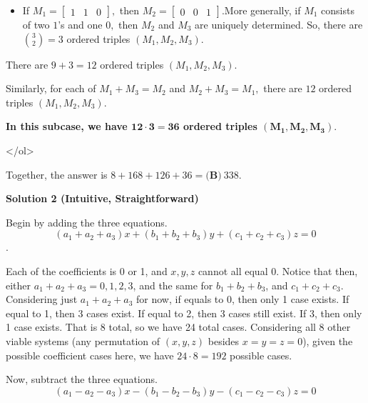 \begin{enumerate}
\begin{enumerate}
\begin{itemize}
        \item If $M_1=\begin{bmatrix}1 & 1 & 0\end{bmatrix},$ then $M_2=\begin{bmatrix}0 & 0 & 1\end{bmatrix}.$More generally, if $M_1$ consists of two $1$'s and one $0,$ then $M_2$ and $M_3$ are uniquely determined. So, there are $\binom32=3$ ordered triples $(M_1,M_2,M_3).$

            \end{itemize}
            There are $9+3=12$ ordered triples $(M_1,M_2,M_3).$ 

 Similarly, for each of $M_1+M_3=M_2$ and $M_2+M_3=M_1,$ there are $12$ ordered triples $(M_1,M_2,M_3).$

 \textbf{In this subcase, we have $\boldsymbol{12\cdot3=36}$ ordered triples $\boldsymbol{(M_1,M_2,M_3).}$}

  

 </ol>
            \end{enumerate}
            Together, the answer is $8+168+126+36=\boxed{\textbf{(B)}\ 338}.$




\textbf{Solution 2 (Intuitive, Straightforward)}

Begin by adding the three equations.
 \[(a_1 + a_2 + a_3)x + (b_1 + b_2 + b_3)y + (c_1 + c_2 + c_3)z = 0\].

 Each of the coefficients is 0 or 1, and $x, y, z$ cannot all equal 0. Notice that then, either $a_1 + a_2 + a_3 = 0, 1, 2, 3$, and the same for $b_1+ b_2 + b_3$, and $c_1 + c_2 + c_3$. Considering just $a_1 + a_2 + a_3$ for now, if equals to 0, then only 1 case exists. If equal to 1, then 3 cases exist. If equal to 2, then 3 cases still exist. If 3, then only 1 case exists. That is 8 total, so we have 24 total cases. Considering all 8 other viable systems (any permutation of $(x,y,z)$ besides $x =y = z = 0$), given the possible coefficient cases here, we have $24 \cdot 8 = 192$ possible cases.

 Now, subtract the three equations.
 \[(a_1-a_2-a_3)x - (b_1-b_2-b_3)y - (c_1-c_2-c_3)z= 0\]


\end{enumerate}
